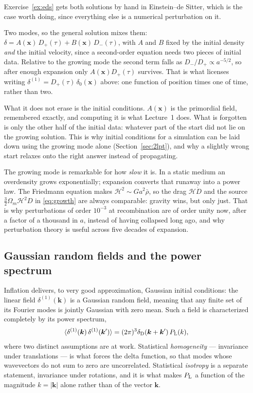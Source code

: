 \documentclass[a4paper,11pt]{article}
\newcommand{\vx}{\bm{x}}
\newcommand{\vk}{\bm{k}}
\def\cH{\mathcal{H}}
\def\Plin{P_{\rm L}}
\def\dirac{\delta_{\rm D}}
\def\Om{\Omega_m}
\numberwithin{equation}{section}
\begin{document}
Exercise~\ref{ex:eds} gets both solutions by hand in Einstein--de Sitter, which
is the case worth doing, since everything else is a numerical perturbation on
it.

Two modes, so the general solution mixes them:
$\delta = A(\vx)\,D_+(\tau) + B(\vx)\,D_-(\tau)$, with $A$ and $B$ fixed by the
initial density \emph{and} the initial velocity, since a second-order equation needs
two pieces of initial data. Relative to the growing mode the second term falls
as $D_-/D_+ \propto a^{-5/2}$, so after enough expansion only $A(\vx)D_+(\tau)$
survives. That is what licenses writing $\delta^{(1)} = D_+(\tau)\,\delta_0(\vx)$
above: one function of position times one of time, rather than two.

What it does not erase is the initial conditions. $A(\vx)$ is the primordial field, remembered exactly, and computing it is what Lecture~1 does. What is forgotten is only the other half of the initial data: whatever part of the start did not lie on the growing
solution. This is why initial conditions for a simulation can be laid down using
the growing mode alone (Section~\ref{sec:2lpt}), and why a slightly wrong start
relaxes onto the right answer instead of propagating.

The growing mode is remarkable for how \emph{slow} it is. In a static medium an
overdensity grows exponentially; expansion converts that runaway into a power
law. The Friedmann equation makes $\cH^2 \sim Ga^2\bar\rho$, so the drag
$\cH\dot D$ and the source $\tfrac32\Om\cH^2 D$ in \eqref{eq:growth} are always
comparable: gravity wins, but only just. That is why
perturbations of order $10^{-3}$ at recombination are of order unity now, after a
factor of a thousand in $a$, instead of having collapsed long ago, and why
perturbation theory is useful across five decades of expansion.

\subsection{Gaussian random fields and the power spectrum}
\label{sec:stats}

Inflation delivers, to very good approximation, Gaussian initial conditions: the linear field $\delta^{(1)}(\vk)$ is a Gaussian random field, meaning that any finite set of its Fourier modes is jointly Gaussian with zero mean. Such a field is characterized completely by its power spectrum,
\begin{equation}
\langle \delta^{(1)}(\vk)\,\delta^{(1)}(\vk')\rangle = (2\pi)^3\dirac(\vk+\vk')\,\Plin(k) ,
\label{eq:plin_def}
\end{equation}
where two distinct assumptions are at work. Statistical \emph{homogeneity} --- invariance under translations --- is what forces the delta function, so that modes whose wavevectors do not sum to zero are uncorrelated. Statistical \emph{isotropy} is a separate statement, invariance under rotations, and it is what makes $\Plin$ a function of the magnitude $k=|\vk|$ alone rather than of the vector $\vk$.
\end{document}
